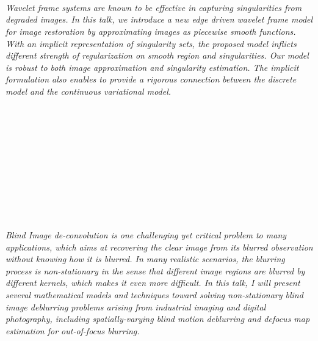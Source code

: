 \begin{multicols}{2}
        \\
        \\\\
        \\
        \\\\
        \\
        \\\\
        \\
        \\\\
\\
      \textit{Wavelet frame systems are known to be effective in capturing singularities from degraded images. In this talk, we introduce a new edge driven wavelet frame model for image restoration by approximating images as piecewise smooth functions. With an implicit representation of singularity sets, the proposed model inflicts different strength of regularization on smooth region and singularities. Our model is robust to both image approximation and singularity estimation. The implicit formulation also enables to provide a rigorous connection between the discrete model and the continuous variational model.}\\
\\ 
        \\
        \\\\
        \\
        \\\\
        \\
        \\\\
\\
      \textit{Blind Image de-convolution is one challenging yet critical problem to many applications, which aims at recovering the clear image from its blurred observation without knowing how it is blurred. In many realistic scenarios, the blurring process is non-stationary in the sense that different image regions are blurred by different kernels, which makes it even more difficult. In this talk, I will present several mathematical models and techniques toward solving non-stationary blind image deblurring problems arising from industrial imaging and digital photography, including spatially-varying blind motion deblurring and defocus map estimation for out-of-focus blurring.}\\

\end{multicols}
